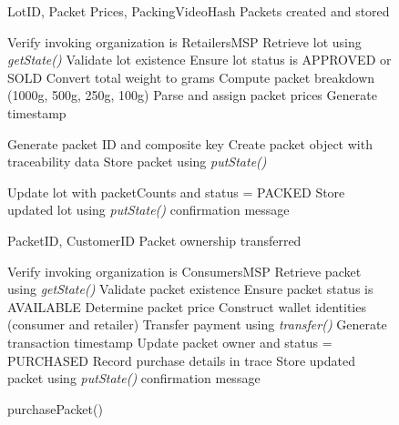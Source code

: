 \documentclass[12pt]{article}
\begin{document}
	
	\begin{figure}[h]
		\centering
		\caption{Comparison of Packing and Packet Purchase Mechanisms}
		\label{fig:packing_purchase}
		
		\begin{minipage}[t]{0.48\linewidth}
			\vspace{0pt}
			\centering
			\begin{algorithm}[H]
				\caption{packLotIntoPackets()}
				\begin{algorithmic}[1]
					
					\Require LotID, Packet Prices, PackingVideoHash
					\Ensure Packets created and stored
					
					\State Verify invoking organization is RetailersMSP
					\State Retrieve lot using \textit{getState()}
					\State Validate lot existence
					\State Ensure lot status is APPROVED or SOLD
					\State Convert total weight to grams
					\State Compute packet breakdown (1000g, 500g, 250g, 100g)
					\State Parse and assign packet prices
					\State Generate timestamp
					
					\State Generate packet ID and composite key
					\State Create packet object with traceability data
					\State Store packet using \textit{putState()}
					\EndFor
					
					\State Update lot with packetCounts and status = PACKED
					\State Store updated lot using \textit{putState()}
					\State \Return confirmation message
					
				\end{algorithmic}
			\end{algorithm}
		\end{minipage}
		\hfill
		\begin{minipage}[t]{0.48\linewidth}
			\vspace{0pt}
			\centering
			\begin{algorithm}[H]
				\caption{purchasePacket()}
				\begin{algorithmic}[1]
					
					\Require PacketID, CustomerID
					\Ensure Packet ownership transferred
					
					\State Verify invoking organization is ConsumersMSP
					\State Retrieve packet using \textit{getState()}
					\State Validate packet existence
					\State Ensure packet status is AVAILABLE
					\State Determine packet price
					\State Construct wallet identities (consumer and retailer)
					\State Transfer payment using \textit{transfer()}
					\State Generate transaction timestamp
					\State Update packet owner and status = PURCHASED
					\State Record purchase details in trace
					\State Store updated packet using \textit{putState()}
					\State \Return confirmation message
					
				\end{algorithmic}
			\end{algorithm}
		\end{minipage}
		
	\end{figure}
	
\end{document}
